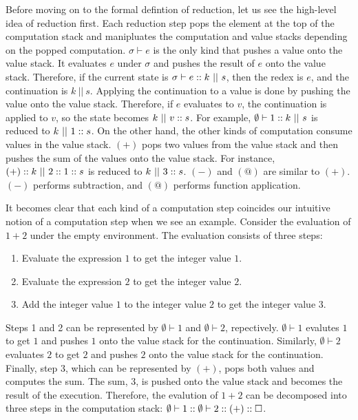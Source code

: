 Before moving on to the formal defintion of reduction, let us see the high-level
idea of reduction first.
Each reduction step pops the element at the top of the computation stack and
manipluates the computation and value stacks depending on the popped computation.
$\sigma\vdash e$ is the only kind that pushes a value onto the value stack.
It evaluates $e$ under $\sigma$ and pushes the result of $e$ onto the value stack.
Therefore, if the current state is $\sigma\vdash e::k\ ||\ s$, then the redex
is $e$, and the continuation is $k\ ||\ s$. Applying the continuation to a value is done by
pushing the value onto the value stack. Therefore, if $e$ evaluates to $v$, the
continuation is applied to $v$, so the state becomes $k\ ||\ \conss{v}s$.
For example, $\emptyset\vdash1::k\ ||\ s$ is reduced to $k\ ||\ 1::s$.
On the other hand, the other kinds of computation consume values in the value stack.
$(+)$ pops two values from the
value stack and then pushes the sum of the values onto the value stack.
For instance, $(+):: k\ ||\ 2::1::s$ is reduced to $k\ ||\ 3::s$.
$(-)$ and $(@)$ are similar to $(+)$. $(-)$ performs subtraction, and $(@)$
performs function application.

It becomes clear that each kind of a computation step coincides our intuitive
notion of a computation step when we see an example. Consider the evaluation of
$1+2$ under the empty environment. The evaluation consists of three steps:
\begin{enumerate}
  \item Evaluate the expression $1$ to get the integer value $1$.
  \item Evaluate the expression $2$ to get the integer value $2$.
  \item Add the integer value $1$ to the integer value $2$ to get the integer
    value $3$.
\end{enumerate}
Steps 1 and 2 can be represented by $\emptyset\vdash1$ and $\emptyset\vdash2$,
repectively. $\emptyset\vdash1$ evalutes $1$ to get $1$ and pushes $1$ onto the
value stack for the continuation. Similarly, $\emptyset\vdash2$ evaluates $2$ to
get $2$ and pushes $2$ onto the value stack for the continuation. Finally,
step 3, which can be represented by $(+)$, pops both values and computes the sum.
The sum, $3$, is pushed onto the value stack and becomes the result of the
execution. Therefore, the evalution of $1+2$ can be decomposed into three steps
in the computation stack:
$\emptyset\vdash1:: \emptyset\vdash2:: (+):: \square$.

